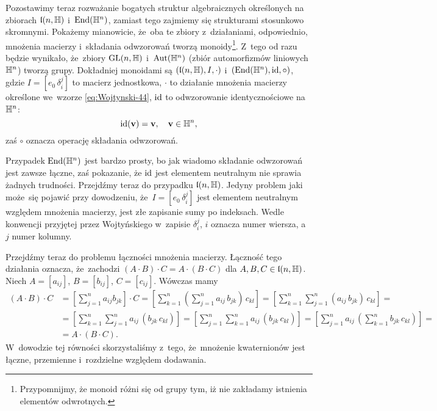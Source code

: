\documentclass[a4paper,11pt]{article}
\begin{document}
Pozostawimy teraz rozważanie bogatych struktur algebraicznych określonych
na zbiorach $\mathfrak{l}( n, \mathbb{H} )$ i~$\mathrm{End}( \mathbb{H}^{ n } )$, zamiast tego
zajmiemy się strukturami stosunkowo skromnymi. Pokażemy mianowicie, że~oba
te zbiory z~działaniami, odpowiednio, mnożenia macierzy i~składania
odwzorowań tworzą monoidy\footnote{Przypomnijmy, że monoid różni się od
  grupy tym, iż nie zakładamy istnienia elementów odwrotnych.}. Z~tego od
razu będzie wynikało, że~zbiory $\mathrm{GL}( n, \mathbb{H} )$ i~$\mathrm{Aut}( \mathbb{H}^{ n } )$
(zbiór automorfizmów liniowych $\mathbb{H}^{ n }$) tworzą grupy. Dokładniej
monoidami są $( \mathfrak{l}( n, \mathbb{H} ), I, \cdot )$
i~$( \mathrm{End}( \mathbb{H}^{ n } ), \mathrm{id}, \circ )$, gdzie $I = [ e_{ 0 } \, \delta^{ j }_{ i } ]$ to
macierz jednostkowa, $\cdot$ to działanie mnożenia macierzy określone we~wzorze \eqref{eq:Wojtynski-44}, $\mathrm{id}$ to odwzorowanie identycznościowe
na~$\mathbb{H}^{ n }$:
\begin{equation}
  \label{eq:Wojtynski-79}
  \mathrm{id}( \mathbf{v} ) = \mathbf{v}, \quad \mathbf{v} \in \mathbb{H}^{ n },
\end{equation}
zaś $\circ$ oznacza operację składania odwzorowań.

Przypadek $\mathrm{End}( \mathbb{H}^{ n } )$ jest bardzo prosty, bo jak wiadomo składanie
odwzorowań jest zawsze łączne, zaś pokazanie, że $\mathrm{id}$ jest elementem
neutralnym nie sprawia żadnych trudności. Przejdźmy teraz do przypadku
$\mathfrak{l}( n, \mathbb{H} )$. Jedyny problem jaki może~się pojawić przy dowodzeniu,
że~$I = [ e_{ 0 } \, \delta^{ j }_{ i } ]$ jest elementem neutralnym względem
mnożenia macierzy, jest złe zapisanie sumy po indeksach. Wedle konwencji
przyjętej przez Wojtyńskiego w~zapisie $\delta^{ j }_{ i }$, $i$ oznacza numer
wiersza, a~$j$ numer kolumny.

Przejdźmy teraz do problemu łączności mnożenia macierzy. Łączność tego
działania oznacza, że~zachodzi $( A \cdot B ) \cdot C = A \cdot ( B \cdot C )$ dla
$A, B, C \in \mathfrak{l}( n, \mathbb{H} )$. Niech $A = [ a_{ i j } ]$, $B = [ b_{ i j } ]$,
$C = [ c_{ i j } ]$. Wówczas mamy
\begin{equation}
  \label{eq:Wojtynski-80}
  \begin{split}
    ( A \cdot B ) \cdot C
    &=
      \left[ \sum_{ j = 1 }^{ n } a_{ i j } b_{ j k } \right] \cdot C =
      \left[ \sum_{ k = 1 }^{ n } \left( \sum_{ j = 1 }^{ n } a_{ i j } \,
      b_{ j k } \right) \, c_{ k l } \right] =
      \left[ \sum_{ k = 1 }^{ n } \sum_{ j = 1 }^{ n } ( a_{ i j } \, b_{ j k } ) \,
      c_{ k l } \right] = \\[0.4em]
    &=
      \left[ \sum_{ k = 1 }^{ n } \sum_{ j = 1 }^{ n } a_{ i j } \, ( b_{ j k } \,
      c_{ k l } ) \right] =
      \left[ \sum_{ j = 1 }^{ n } \sum_{ k = 1 }^{ n } a_{ i j } \, ( b_{ j k } \,
      c_{ k l } ) \right] =
      \left[ \sum_{ j = 1 }^{ n } a_{ i j } \,
      \left( \sum_{ k = 1 }^{ n } b_{ j k } \, c_{ k l } \right) \right]
      = \\[0.4em]
    &=
      A \cdot ( B \cdot C ).
  \end{split}
\end{equation}
W~dowodzie tej równości skorzystaliśmy z~tego, że~mnożenie kwaternionów
jest łączne, przemienne i~rozdzielne względem dodawania.
\end{document}
